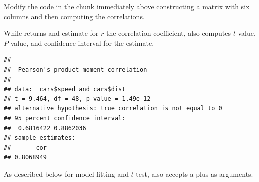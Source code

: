\documentclass[krantz2]{krantz}\usepackage{knitr}%
\begin{document}
\begin{playground}
Modify the code in the chunk immediately above constructing a matrix with six columns and then computing the correlations.
\end{playground}

While  returns and estimate for $r$ the correlation coefficient,  also computes $t$-value, $P$-value, and confidence interval for the estimate.

\begin{knitrout}\footnotesize
{}\color{fgcolor}\begin{kframe}
\begin{alltt}
\hlstd{(} \hlopt{$}  \hlopt{$}
\end{alltt}
\begin{verbatim}
## 
## 	Pearson's product-moment correlation
## 
## data:  cars$speed and cars$dist
## t = 9.464, df = 48, p-value = 1.49e-12
## alternative hypothesis: true correlation is not equal to 0
## 95 percent confidence interval:
##  0.6816422 0.8862036
## sample estimates:
##       cor 
## 0.8068949
\end{verbatim}
\end{kframe}
\end{knitrout}

As described below for model fitting and $t$-test,  also accepts a  plus  as arguments.
\end{document}
